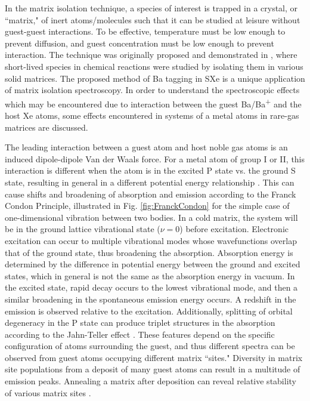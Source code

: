 
In the matrix isolation technique, a species of interest is trapped in a crystal, or ``matrix," of inert atoms/molecules such that it can be studied at leisure without guest-guest interactions.  To be effective, temperature must be low enough to prevent diffusion, and guest concentration must be low enough to prevent interaction.  The technique was originally proposed and demonstrated in \cite{matrixIso}, where short-lived species in chemical reactions were studied by isolating them in various solid matrices.  The proposed method of Ba tagging in SXe is a unique application of matrix isolation spectroscopy.  In order to understand the spectroscopic effects which may be encountered due to interaction between the guest Ba/Ba\textsuperscript{+} and the host Xe atoms, some effects encountered in systems of a metal atoms in rare-gas matrices are discussed.


The leading interaction between a guest atom and host noble gas atoms is an induced dipole-dipole Van der Waals force.  For a metal atom of group I or II, this interaction is different when the atom is in the excited P state vs. the ground S state, resulting in general in a different potential energy relationship \cite{crepin}.  This can cause shifts and broadening of absorption and emission according to the Franck Condon Principle, illustrated in Fig. \ref{fig:FranckCondon} for the simple case of one-dimensional vibration between two bodies.  In a cold matrix, the system will be in the ground lattice vibrational state ($\nu =0$) before excitation.  Electronic excitation can occur to multiple vibrational modes whose wavefunctions overlap that of the ground state, thus broadening the absorption.  Absorption energy is determined by the difference in potential energy between the ground and excited states, which in general is not the same as the absorption energy in vacuum.  In the excited state, rapid decay occurs to the lowest vibrational mode, and then a similar broadening in the spontaneous emission energy occurs.  A redshift in the emission is observed relative to the excitation.  Additionally, splitting of orbital degeneracy in the P state can produce triplet structures in the absorption according to the Jahn-Teller effect \cite{jahnteller}.  These features depend on the specific configuration of atoms surrounding the guest, and thus different spectra can be observed from guest atoms occupying different matrix ``sites."  Diversity in matrix site populations from a deposit of many guest atoms can result in a multitude of emission peaks.  Annealing a matrix after deposition can reveal relative stability of various matrix sites \cite{crepin}.

